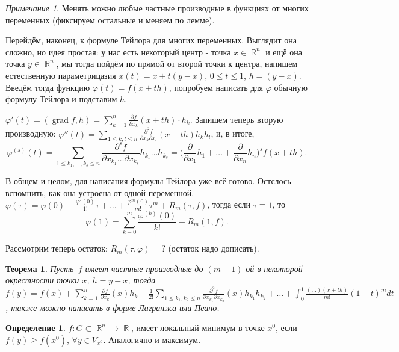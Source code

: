 \documentclass[a4paper,100pt]{article}
\theoremstyle{indented}
\newtheorem{theorem}{Теорема}
\theoremstyle{definition}
\newtheorem{defn}{Определение}
\theoremstyle{remark}
\newtheorem{remark}{Примечание}
\DeclareMathOperator{\RR}{\mathbb{R}}
\DeclareMathOperator{\grad}{grad}
\begin{document}
\begin{remark}
    Менять можно любые частные производные в функциях от многих переменных (фиксируем остальные и меняем по лемме).
\end{remark}

Перейдём, наконец, к формуле Тейлора для многих переменных. Выглядит она сложно, но идея простая: у нас есть некоторый центр - точка $x\in\RR^n$ и ещё она точка $y\in\RR^n$, мы тогда пойдём по прямой от второй точки к центра, напишем естественную параметрицазия $x(t)=x+t(y-x)$, $0\leq t\leq 1$, $h=(y-x)$. Введём тогда функцию $\varphi(t)=f(x+th)$, попробуем написать для $\varphi$ обычную формулу Тейлора и подставим $h$. \ 

$\varphi'(t)=(\grad f, h)=\sum_{k=1}^n\frac{\partial f}{\partial x_k}(x+th)\cdot h_k$. Запишем теперь вторую производную: $\varphi''(t)=\sum_{1\leq k, l\leq n}\frac{\partial ^2 f}{\partial x_k\partial x_l}(x+th)h_kh_l$, и, в итоге, 
\[
    \varphi^{(s)}(t)=\sum_{1\leq k_1, \ldots, k_s\leq n}\frac{\partial^s f}{\partial x_{k_1}\ldots \partial x_{k_s}}h_{k_1}\dots h_{k_s} = \biggl(\frac{\partial}{\partial x_1}h_1+\ldots+\frac{\partial}{\partial x_n}h_n\biggr)^s f(x+th). 
\]

В общем и целом, для написания формулы Тейлора уже всё готово. Остслось вспомнить, как она устроена от одной переменной. $\varphi(\tau)=\varphi(0)+\frac{\varphi'(0)}{1!}\tau+\ldots+\frac{\varphi^m(0)}{m!}\tau^m+R_m(\tau, f)$, тогда если $\tau\equiv 1$, то 
\[
    \varphi(1)=\sum_{k-0}^m\frac{\varphi^{(k)}(0)}{k!}+R_m(1, f). 
\]

Рассмотрим теперь остаток: $R_m(\tau, \varphi)=?$ (остаток надо дописать).\\

\begin{theorem}
    Пусть $f$ имеет частные производные до $(m+1)$-ой в некоторой окрестности точки $x$, $h=y-x$, тогда $f(y)=f(x)+\sum_{k=1}^n\frac{\partial f}{\partial x_k}(x)h_k+\frac{1}{2!}\sum_{1\leq k_1, k_2\leq n}\frac{\partial ^2 f}{\partial x_{k_1}\partial x_{k_2}}(x)h_{k_1}h_{k_2}+\ldots+\int_0^1\frac{(\ldots)(x+th)}{m!}(1-t)^m dt$, также можно написать в форме Лагранжа или Пеано.
\end{theorem}

\begin{defn}
    $f:G\subset \RR^n\rightarrow \RR$, имеет локальный минимум в точке $x^0$, если $f(y)\geq f(x^0)$, $\forall y\in V_{x^0}$. Аналогично и максимум.
\end{defn}
\end{document}

